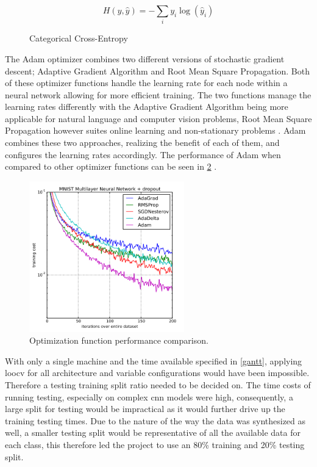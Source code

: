 \documentclass[12pt]{article}
\begin{document}
\begin{figure}[H]
\[ H(y, \hat{y}) = -\sum_{i} y_i \log(\hat{y}_i)  \]
\caption{Categorical Cross-Entropy}
\label{eq:cat-ce}
\end{figure}

The Adam optimizer combines two different versions of stochastic gradient descent; Adaptive Gradient Algorithm and Root Mean Square Propagation. Both of these optimizer functions handle the learning rate for each node within a neural network allowing for more efficient training. The two functions manage the learning rates differently with the Adaptive Gradient Algorithm being more applicable for natural language and computer vision problems, Root Mean Square Propagation however suites online learning and non-stationary problems \cite{brownlee2021adam}. Adam combines these two approaches, realizing the benefit of each of them, and configures the learning rates accordingly. The performance of Adam when compared to other optimizer functions can be seen in \ref{fig:adam} \cite{brownlee2021adam}.


\begin{figure}[H]
\includegraphics[width=0.6\textwidth]{adam}
\centering
\caption{Optimization function performance comparison.}
\label{fig:adam}
\end{figure}


With only a single machine and the time available specified in \ref{gantt}, applying \acrfull{loocv} for all architecture and variable configurations would have been impossible. Therefore a testing training split ratio needed to be decided on. The time costs of running testing, especially on complex \acrshort{cnn} models were high, consequently, a large split for testing would be impractical as it would further drive up the training testing times. Due to the nature of the way the data was synthesized as well, a smaller testing split would be representative of all the available data for each class, this therefore led the project to use an 80\% training and 20\% testing split. 
\end{document}

